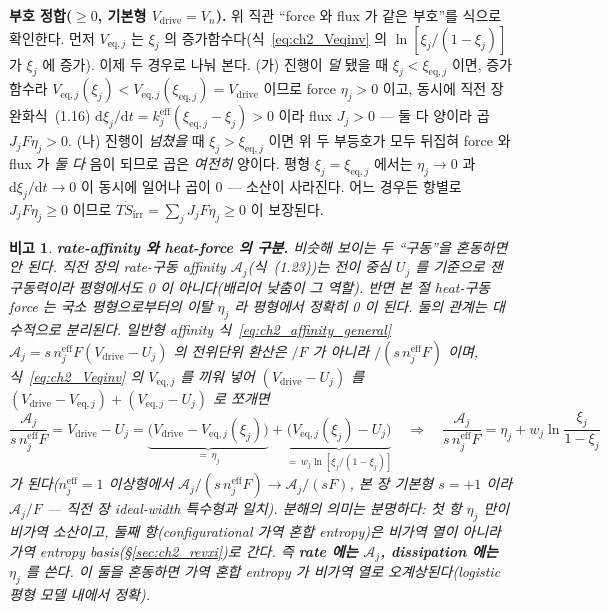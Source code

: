 \documentclass[11pt,a4paper]{article}
\newtheorem*{flagbox}{비고}
\newcommand{\dd}{\mathrm{d}}
\newcommand{\eff}{\mathrm{eff}}
\newcommand{\eq}{\mathrm{eq}}
\newcommand{\drive}{\mathrm{drive}}
\newcommand{\irr}{\mathrm{irr}}
\begin{document}
\textbf{부호 정합($\ge0$, 기본형 $V_\drive=V_n$).} 위 직관 ``force 와 flux 가 같은 부호''를 식으로 확인한다.
먼저 $V_{\eq,j}$ 는 $\xi_j$ 의 증가함수다(식~\eqref{eq:ch2_Veqinv} 의 $\ln[\xi_j/(1-\xi_j)]$ 가 $\xi_j$ 에 증가).
이제 두 경우로 나눠 본다. (가) 진행이 \emph{덜} 됐을 때 $\xi_j<\xi_{\eq,j}$ 이면, 증가함수라
$V_{\eq,j}(\xi_j)<V_{\eq,j}(\xi_{\eq,j})=V_\drive$ 이므로 force $\eta_j>0$ 이고, 동시에 직전 장 완화식~(1.16)
$\dd\xi_j/\dd t=k_j^{\eff}(\xi_{\eq,j}-\xi_j)>0$ 이라 flux $J_j>0$ — 둘 다 양이라 곱 $J_jF\eta_j>0$. (나) 진행이
\emph{넘쳤을} 때 $\xi_j>\xi_{\eq,j}$ 이면 위 두 부등호가 모두 뒤집혀 force 와 flux 가 \emph{둘 다} 음이 되므로 곱은
\emph{여전히} 양이다. 평형 $\xi_j=\xi_{\eq,j}$ 에서는 $\eta_j\to0$ 과 $\dd\xi_j/\dd t\to0$ 이 동시에 일어나 곱이 $0$
— 소산이 사라진다. 어느 경우든 항별로 $J_jF\eta_j\ge0$ 이므로 $T\dot S_{\irr}=\sum_j J_jF\eta_j\ge0$ 이 보장된다.
\begin{flagbox}
\textbf{rate-affinity 와 heat-force 의 구분.} 비슷해 보이는 두 ``구동''을 혼동하면 안 된다. 직전 장의 rate-구동
affinity $\mathcal A_j$(식~(1.23))는 전이 \emph{중심} $U_j$ 를 기준으로 잰 구동력이라 평형에서도 0 이 아니다(배리어
낮춤이 그 역할). 반면 본 절 heat-구동 force 는 \emph{국소 평형}으로부터의 이탈 $\eta_j$ 라 평형에서 정확히 0 이
된다. 둘의 관계는 대수적으로 분리된다. 일반형 affinity 식~\eqref{eq:ch2_affinity_general}
$\mathcal A_j=s\,n_j^{\eff}F(V_\drive-U_j)$ 의 전위단위 환산은 $/F$ 가 아니라 $/(s\,n_j^{\eff}F)$ 이며,
식~\eqref{eq:ch2_Veqinv} 의 $V_{\eq,j}$ 를 끼워 넣어 $(V_\drive-U_j)$ 를 $(V_\drive-V_{\eq,j})+(V_{\eq,j}-U_j)$ 로
쪼개면
\[
\frac{\mathcal A_j}{s\,n_j^{\eff}F}=V_\drive-U_j
=\underbrace{\big(V_\drive-V_{\eq,j}(\xi_j)\big)}_{=\,\eta_j}
+\underbrace{\big(V_{\eq,j}(\xi_j)-U_j\big)}_{=\,w_j\ln[\xi_j/(1-\xi_j)]}
\quad\Longrightarrow\quad
\frac{\mathcal A_j}{s\,n_j^{\eff}F}=\eta_j+w_j\ln\frac{\xi_j}{1-\xi_j}
\]
가 된다($n_j^{\eff}=1$ 이상형에서 $\mathcal A_j/(s\,n_j^{\eff}F)\to\mathcal A_j/(sF)$, 본 장 기본형 $s=+1$ 이라
$\mathcal A_j/F$ — 직전 장 ideal-width 특수형과 일치). 분해의 의미는 분명하다: 첫 항 $\eta_j$ 만이 비가역 소산이고,
둘째 항(configurational 가역 혼합 entropy)은 비가역 열이 아니라 가역 entropy basis(\S\ref{sec:ch2_revxi})로 간다.
즉 \textbf{rate 에는 $\mathcal A_j$, dissipation 에는 $\eta_j$} 를 쓴다. 이 둘을 혼동하면 가역 혼합 entropy 가
비가역 열로 오계상된다(logistic 평형 모델 내에서 정확).
\end{flagbox}
\end{document}

